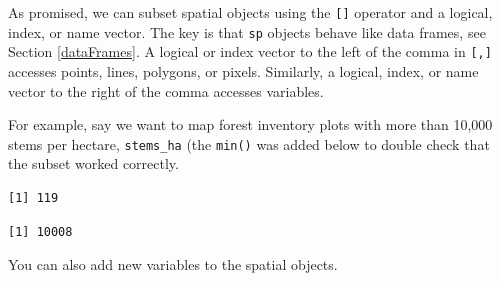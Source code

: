 \documentclass[
]{krantz}
\makeatletter
\newenvironment{Shaded}{\begin{snugshade}}{\end{snugshade}}
\newcommand{\DecValTok}[1]{\textcolor[rgb]{0.06,0.06,0.06}{#1}}
\newcommand{\FloatTok}[1]{\textcolor[rgb]{0.06,0.06,0.06}{#1}}
\newcommand{\KeywordTok}[1]{\textcolor[rgb]{0.27,0.27,0.27}{\textbf{#1}}}
\newcommand{\NormalTok}[1]{#1}
\newcommand{\OperatorTok}[1]{\textcolor[rgb]{0.43,0.43,0.43}{\textbf{#1}}}
\newcommand{\StringTok}[1]{\textcolor[rgb]{0.5,0.5,0.5}{#1}}
\newenvironment{kframe}{%
\medskip{}
\setlength{\fboxsep}{.8em}
 \def\at@end@of@kframe{}%
 \ifinner\ifhmode%
  \def\at@end@of@kframe{\end{minipage}}%
  \begin{minipage}{\columnwidth}%
 \fi\fi%
 \def\FrameCommand##1{\hskip\@totalleftmargin \hskip-\fboxsep
 \colorbox{shadecolor}{##1}\hskip-\fboxsep
     \hskip-\linewidth \hskip-\@totalleftmargin \hskip\columnwidth}%
 \MakeFramed {\advance\hsize-\width
   \@totalleftmargin\z@ \linewidth\hsize
   \@setminipage}}%
 {\par\unskip\endMakeFramed%
 \at@end@of@kframe}
\renewenvironment{Shaded}{\begin{kframe}}{\end{kframe}}
\makeatother
\begin{document}
As promised, we can subset spatial objects using the \texttt{{[}{]}} operator and a logical, index, or name vector. The key is that \texttt{sp} objects behave like data frames, see Section \ref{dataFrames}. A logical or index vector to the left of the comma in \texttt{{[},{]}} accesses points, lines, polygons, or pixels. Similarly, a logical, index, or name vector to the right of the comma accesses variables.

For example, say we want to map forest inventory plots with more than 10,000 stems per hectare, \texttt{stems\_ha} (the \texttt{min()} was added below to double check that the subset worked correctly.

\begin{Shaded}
\end{Shaded}

\begin{verbatim}
[1] 119
\end{verbatim}

\begin{Shaded}
\end{Shaded}

\begin{verbatim}
[1] 10008
\end{verbatim}

You can also add new variables to the spatial objects.

\begin{Shaded}
\end{Shaded}
\end{document}
